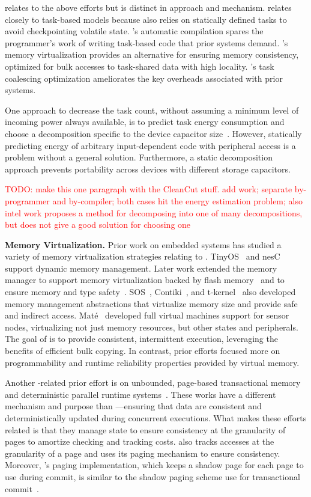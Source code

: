 \sys relates to the above efforts but is distinct in approach and mechanism. \sys relates closely to task-based models because \sys also relies on statically defined tasks to avoid checkpointing volatile state. \sys's automatic compilation spares the programmer's work of writing task-based code that prior systems demand. \sys's memory virtualization provides an alternative for ensuring memory consistency, optimized for bulk accesses to task-shared data with high locality. \sys's task coalescing optimization ameliorates the key overheads associated with prior systems.

One approach to decrease the task count, without assuming a minimum level of
incoming power always available, is to predict task energy consumption and
choose a decomposition specific to the device capacitor size~\cite{cleancut}.
However, statically predicting energy of arbitrary input-dependent code with
peripheral access is a problem without a general solution. Furthermore, a
static decomposition approach prevents portability across devices with
different storage capacitors.

\textcolor{red}{TODO: make this one paragraph with the CleanCut stuff.  add \cite{intel} work; separate by-programmer and by-compiler;
both cases hit the energy estimation problem; also intel work proposes a method
for decomposing into one of many decompositions, but does not give a good
solution for choosing one} 



\textbf{Memory Virtualization.} Prior work on embedded systems has studied a variety of memory virtualization strategies relating to \sys. TinyOS~\cite{levis2005tinyos} and nesC~\cite{nesc} support dynamic memory management. Later work extended the memory manager to support memory virtualization backed by flash memory~\cite{sensornetvm} and to ensure memory and type safety~\cite{tinyosmemorysafety}. SOS~\cite{sos}, Contiki~\cite{contiki}, and
t-kernel~\cite{tkernel} also developed memory management abstractions that
virtualize memory size and provide safe and indirect access. Mat\'e~\cite{mate} developed full virtual machines support for sensor nodes, virtualizing not just memory resources, but other states and peripherals. The goal of \sys is to provide consistent, intermittent execution, leveraging the benefits of efficient bulk copying. In contrast, prior efforts focused more on programmability and runtime reliability properties provided by virtual memory.

Another \sys-related prior effort is on unbounded, page-based transactional memory and deterministic parallel runtime systems~\cite{pagebasedtm,grace}. These works have a different mechanism and purpose than \sys---ensuring that data are consistent and deterministically updated during concurrent executions. What makes these
efforts related is that they manage state to ensure consistency at the
granularity of pages to amortize checking and tracking costs. \sys also tracks
accesses at the granularity of a page and uses its paging mechanism to ensure
consistency. Moreover, \sys's paging implementation, which keeps a shadow page
for each page to use during commit, is similar to the shadow paging scheme
use for transactional commit~\cite{pagebasedtm}.
